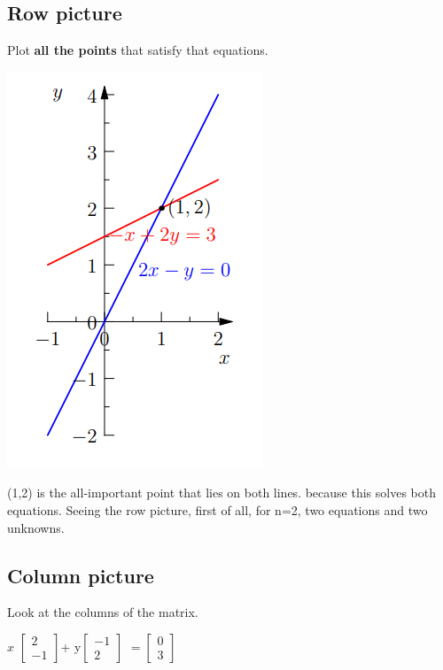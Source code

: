 \documentclass{article}
\begin{document}
\subsection{Row picture}
Plot \textbf{all the points} that satisfy that equations.
\begin{center}
\includegraphics{images/rowpicture.png}
    
\end{center}

(1,2) is the all-important point that lies on both lines. because this solves both equations. Seeing the row picture, first of all, for n=2, two equations and two unknowns.

\subsection{Column picture}
Look at the columns of the matrix.
\begin{center}
$x$
$\begin{bmatrix}
2  \\
-1  
\end{bmatrix}
$+ y$
\begin{bmatrix}
-1\\
2
\end{bmatrix}$
$=
\begin{bmatrix}
0\\
3
\end{bmatrix}$

\end{center}
\end{document}
